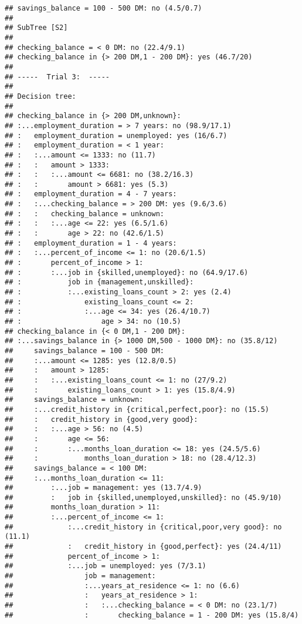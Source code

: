 \documentclass[
]{article}
\begin{document}
\begin{verbatim}
## savings_balance = 100 - 500 DM: no (4.5/0.7)
## 
## SubTree [S2]
## 
## checking_balance = < 0 DM: no (22.4/9.1)
## checking_balance in {> 200 DM,1 - 200 DM}: yes (46.7/20)
## 
## -----  Trial 3:  -----
## 
## Decision tree:
## 
## checking_balance in {> 200 DM,unknown}:
## :...employment_duration = > 7 years: no (98.9/17.1)
## :   employment_duration = unemployed: yes (16/6.7)
## :   employment_duration = < 1 year:
## :   :...amount <= 1333: no (11.7)
## :   :   amount > 1333:
## :   :   :...amount <= 6681: no (38.2/16.3)
## :   :       amount > 6681: yes (5.3)
## :   employment_duration = 4 - 7 years:
## :   :...checking_balance = > 200 DM: yes (9.6/3.6)
## :   :   checking_balance = unknown:
## :   :   :...age <= 22: yes (6.5/1.6)
## :   :       age > 22: no (42.6/1.5)
## :   employment_duration = 1 - 4 years:
## :   :...percent_of_income <= 1: no (20.6/1.5)
## :       percent_of_income > 1:
## :       :...job in {skilled,unemployed}: no (64.9/17.6)
## :           job in {management,unskilled}:
## :           :...existing_loans_count > 2: yes (2.4)
## :               existing_loans_count <= 2:
## :               :...age <= 34: yes (26.4/10.7)
## :                   age > 34: no (10.5)
## checking_balance in {< 0 DM,1 - 200 DM}:
## :...savings_balance in {> 1000 DM,500 - 1000 DM}: no (35.8/12)
##     savings_balance = 100 - 500 DM:
##     :...amount <= 1285: yes (12.8/0.5)
##     :   amount > 1285:
##     :   :...existing_loans_count <= 1: no (27/9.2)
##     :       existing_loans_count > 1: yes (15.8/4.9)
##     savings_balance = unknown:
##     :...credit_history in {critical,perfect,poor}: no (15.5)
##     :   credit_history in {good,very good}:
##     :   :...age > 56: no (4.5)
##     :       age <= 56:
##     :       :...months_loan_duration <= 18: yes (24.5/5.6)
##     :           months_loan_duration > 18: no (28.4/12.3)
##     savings_balance = < 100 DM:
##     :...months_loan_duration <= 11:
##         :...job = management: yes (13.7/4.9)
##         :   job in {skilled,unemployed,unskilled}: no (45.9/10)
##         months_loan_duration > 11:
##         :...percent_of_income <= 1:
##             :...credit_history in {critical,poor,very good}: no (11.1)
##             :   credit_history in {good,perfect}: yes (24.4/11)
##             percent_of_income > 1:
##             :...job = unemployed: yes (7/3.1)
##                 job = management:
##                 :...years_at_residence <= 1: no (6.6)
##                 :   years_at_residence > 1:
##                 :   :...checking_balance = < 0 DM: no (23.1/7)
##                 :       checking_balance = 1 - 200 DM: yes (15.8/4)

\end{verbatim}
\end{document}

